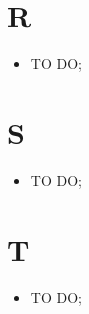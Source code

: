 \section*{R} %
\label{sec:r}
	\begin{itemize}
		\item TO DO;
	\end{itemize}

\section*{S} %
\label{sec:s}
	\begin{itemize}
		\item TO DO;
	\end{itemize}

\section*{T} %
\label{sec:t}
	\begin{itemize}
		\item TO DO;
	\end{itemize}
